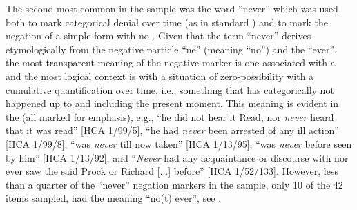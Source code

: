 The second most common  in the sample was the word “never” which was used both to mark categorical denial over time (as in standard ) and to mark the negation of a simple  form with no . Given that the term “never” derives etymologically from the negative particle “ne” (meaning “no”) and the  “ever”, the most transparent meaning of the negative marker is one associated with a  and the most logical context is with a situation of zero-possibility with a cumulative quantification over time, i.e., something that has categorically not happened up to and including the present moment. This meaning is evident in the  (all marked for emphasis), e.g., “he did not hear it Read, nor \textit{never} heard that it was read” [HCA 1/99/5], “he had \textit{never} been arrested of any ill action” [HCA 1/99/8], “was \textit{never} till now taken” [HCA 1/13/95], “was \textit{never} before seen by him” [HCA 1/13/92], and “\textit{Never} had any acquaintance or discourse with nor ever saw the said Prock or Richard [...] before” [HCA 1/52/133]. However, less than a quarter of the “never” negation markers in the sample, only 10 of the 42 items sampled, had the meaning “no(t) ever”, see .

